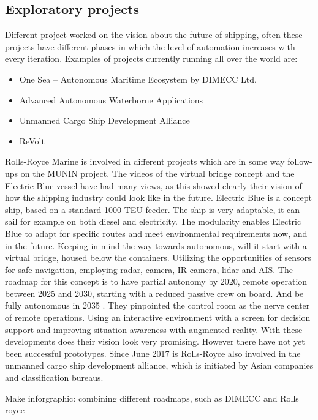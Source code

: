 \subsection{Exploratory projects}
Different project worked on the vision about the future of shipping, often these projects have different phases in which the level of automation increases with every iteration. Examples of projects currently running all over the world are:
\begin{itemize}
	\item One Sea – Autonomous Maritime Ecosystem by DIMECC Ltd.
	\item Advanced Autonomous Waterborne Applications
	\item Unmanned Cargo Ship Development Alliance 
	\item ReVolt
\end{itemize}
Rolls-Royce Marine is involved in different projects which are in some way follow-ups on the MUNIN project. The videos of the virtual bridge concept and the Electric Blue vessel have had many views, as this showed clearly their vision of how the shipping industry could look like in the future. Electric Blue is a concept ship, based on a standard 1000 \ac{TEU} feeder. The ship is very adaptable, it can sail for example on both diesel and electricity. The modularity enables Electric Blue to adapt for specific routes and meet environmental requirements now, and in the future. 
Keeping in mind the way towards autonomous, will it start with a virtual bridge, housed below the containers. Utilizing the opportunities of sensors for safe navigation, employing radar, camera, IR camera, lidar and \ac{AIS}. The roadmap for this concept is to have partial autonomy by 2020, remote operation between 2025 and 2030, starting with a reduced passive crew on board. And be fully autonomous in 2035 \cite{Wilson2017}. 
They pinpointed the control room as the nerve center of remote operations. Using an interactive environment with a screen for decision support and improving situation awareness with augmented reality. With these developments does their vision look very promising. However there have not yet been successful prototypes.
Since June 2017 is Rolls-Royce also involved in the unmanned cargo ship development alliance, which is initiated by Asian companies and classification bureaus.

Make inforgraphic: combining different roadmaps, such as DIMECC and Rolls royce

